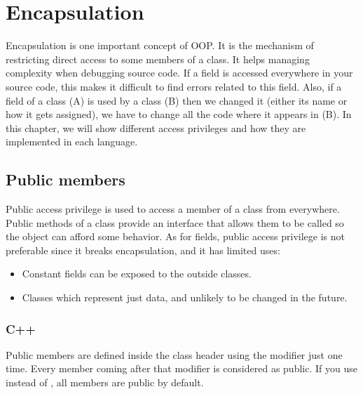 \documentclass{KodeBook}
\begin{document}
\fi

\chapter{Encapsulation}

\begin{introduction}
	Encapsulation is one important concept of OOP. 
	It is the mechanism of restricting direct access to some members of a class.
	It helps managing complexity when debugging source code. 
	If a field is accessed everywhere in your source code, this makes it difficult to find errors related to this field. 
	Also, if a field of a class (A) is used by a class (B) then we changed it (either its name or how it gets assigned), we have to change all the code where it appears in (B).
	In this chapter, we will show different access privileges and how they are implemented in each language.
\end{introduction}

\section{Public members}

Public access privilege is used to access a member of a class from everywhere. 
Public methods of a class provide an interface that allows them to be called so the object can afford some behavior. 
As for fields, public access privilege is not preferable since it breaks encapsulation, and it has limited uses:
\begin{itemize}
	\item Constant fields can be exposed to the outside classes.%
	\item Classes which represent just data, and unlikely to be changed in the future.
\end{itemize}

\subsection{C++}

Public members are defined inside the class header using the modifier  just one time. 
Every member coming after that modifier is considered as public.
If you use  instead of , all members are public by default.


\end{document}

